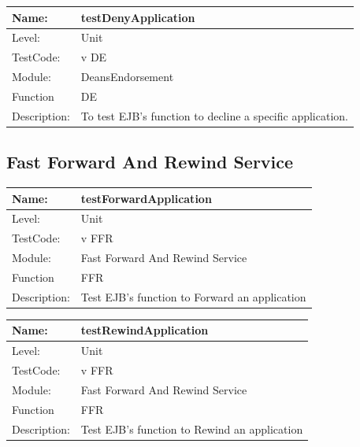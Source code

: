 \documentclass[12pt]{article}
\begin{document}
\begin{center}
\begin{tabular}{|l|p{12cm}|}
\hline

 Name: & testDenyApplication  \\
\hline
Level: & Unit \\
\hline
TestCode: & v DE \\
\hline
Module:& DeansEndorsement \\
\hline
Function & DE \\
\hline
Description: & To test EJB's function to decline a specific application. \\
\hline
\end{tabular}
\end{center}

\subsection{Fast Forward And Rewind Service}

\begin{center}
\begin{tabular}{|l|p{12cm}|}
\hline

 Name: & testForwardApplication  \\
\hline
Level: & Unit \\
\hline
TestCode: & v FFR \\
\hline
Module:& Fast Forward And Rewind Service \\
\hline
Function & FFR \\
\hline
Description: & Test EJB's function to Forward an application\\
\hline
\end{tabular}
\end{center}

\begin{center}
\begin{tabular}{|l|p{12cm}|}
\hline

 Name: & testRewindApplication  \\
\hline
Level: & Unit \\
\hline
TestCode: & v FFR \\
\hline
Module:& Fast Forward And Rewind Service \\
\hline
Function & FFR \\
\hline
Description: & Test EJB's function to Rewind an application\\
\hline
\end{tabular}
\end{center}
\end{document}
